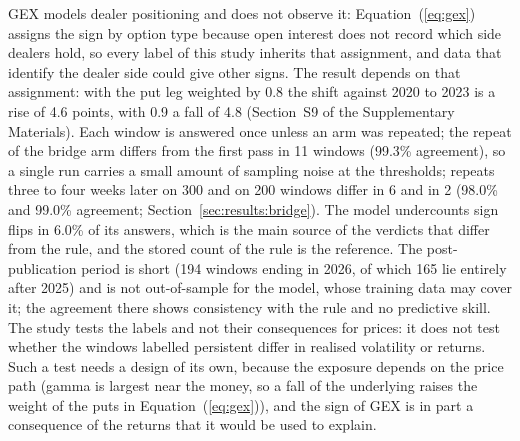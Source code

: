 GEX models dealer positioning and does not observe it: Equation~(\ref{eq:gex}) assigns the sign by option type because open interest does not record which side dealers hold, so every label of this study inherits that assignment, and data that identify the dealer side could give other signs. The result depends on that assignment: with the put leg weighted by 0.8 the shift against 2020 to 2023 is a rise of 4.6 points, with 0.9 a fall of 4.8 (Section~S9 of the Supplementary Materials).
Each window is answered once unless an arm was repeated; the repeat of the bridge arm differs from the first pass in 11 windows (99.3\% agreement), so a single run carries a small amount of sampling noise at the thresholds; repeats three to four weeks later on 300 and on 200 windows differ in 6 and in 2 (98.0\% and 99.0\% agreement; Section~\ref{sec:results:bridge}).
The model undercounts sign flips in 6.0\% of its answers, which is the main source of the verdicts that differ from the rule, and the stored count of the rule is the reference.
The post-publication period is short (194 windows ending in 2026, of which 165 lie entirely after 2025) and is not out-of-sample for the model, whose training data may cover it; the agreement there shows consistency with the rule and no predictive skill.
The study tests the labels and not their consequences for prices: it does not test whether the windows labelled persistent differ in realised volatility or returns. Such a test needs a design of its own, because the exposure depends on the price path (gamma is largest near the money, so a fall of the underlying raises the weight of the puts in Equation~(\ref{eq:gex})), and the sign of GEX is in part a consequence of the returns that it would be used to explain.
